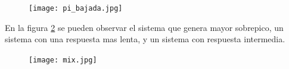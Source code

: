     \begin{figure}[h!]
    	\centering
    	\texttt{[image: pi\_bajada.jpg]}
    	\label{fig:pibajada}
    \end{figure}
    
    
    En la figura \ref{fig:mix} se pueden observar el sistema que genera mayor sobrepico, un sistema con una respuesta mas lenta, y un sistema con respuesta intermedia. 
    \begin{figure}[h!]
    	\centering
    	\texttt{[image: mix.jpg]}
    	\label{fig:mix}
    \end{figure}
    
    \newpage